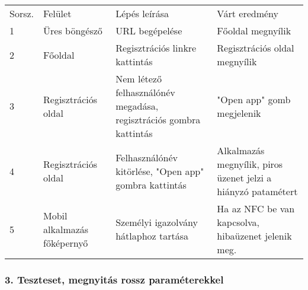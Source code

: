 \begin{minipage}{1\textwidth}
\begin{tabular}{|p{1cm}|p{3cm} |p{5cm}| p{4cm}|}
  \hline
\rowcolor{Title}
\multicolumn{4}{ |c| }{\color{white} Teszteset leírása} \\
  \hline
\rowcolor{Header}
Sorsz. & Felület & Lépés leírása & Várt eredmény \tabularnewline
\hline 
 
 1 & Üres böngésző & URL begépelése & Főoldal megnyílik \tabularnewline
  \hline
 2 & Főoldal & Regisztrációs linkre kattintás & Regisztrációs oldal megnyílik \tabularnewline
  \hline
 3 & Regisztrációs oldal & Nem létező felhasználónév megadása, regisztrációs gombra kattintás & "Open app" gomb megjelenik \tabularnewline
  \hline
 4 & Regisztrációs oldal & Felhasználónév kitörlése, "Open app" gombra kattintás & Alkalmazás megnyílik, piros üzenet jelzi a hiányzó patamétert \tabularnewline
  \hline
 5 & Mobil alkalmazás főképernyő & Személyi igazolvány hátlaphoz tartása & Ha az NFC be van kapcsolva, hibaüzenet jelenik meg. \tabularnewline
  \hline
\end{tabular}
\end{minipage}
\subsubsection{3. Teszteset, megnyitás rossz  paraméterekkel}

\newpage